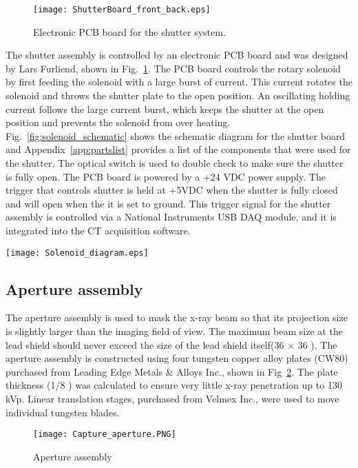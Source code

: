 \begin{figure}
\centering
\texttt{[image: ShutterBoard\_front\_back.eps]}
\caption{Electronic PCB board for the shutter system.}
\label{fig:shutterboard}
\end{figure}

The shutter assembly is controlled by an electronic PCB board and was designed by Lars Furliend, shown in Fig.~\ref{fig:shutterboard}.  The PCB board controls the rotary solenoid by first feeding the solenoid with a large burst of current.  This current rotates the solenoid and throws the shutter plate to the open position.  An oscillating holding current follows the large current burst, which keeps the shutter at the open position and prevents the solenoid from over heating.  Fig.~\ref{fig:solenoid_schematic} shows the schematic diagram for the shutter board and Appendix~\ref{app:partslist} provides a list of the components that were used for the shutter.  The optical switch is used to double check to make sure the shutter is fully open.  The PCB board is powered by a +24 VDC power supply.  The trigger that controls shutter is held at +5VDC when the shutter is fully closed and will open when the it is set to ground.  This trigger signal for the shutter assembly is controlled via a National Instruments USB DAQ module, and it is integrated into the CT acquisition software.
%
\begin{sidewaysfigure}[h]
\centering
\texttt{[image: Solenoid\_diagram.eps]}
\caption{Schematic for the solenoid PCB board}
\label{fig:solenoid_schematic}
\end{sidewaysfigure}
		
\subsection{Aperture assembly}
The aperture assembly is used to mask the x-ray beam so that its projection size is slightly larger than the imaging field of view.  The maximum beam size at the lead shield should never exceed the size of the lead shield itself(36 \inches $\times$ 36 \inches).  The aperture assembly is constructed using four tungsten copper alloy plates (CW80) purchased from Leading Edge Metals \& Alloys Inc., shown in Fig~\ref{fig:aperture}.  The plate thickness (1/8 \inches) was calculated to ensure very little x-ray penetration up to 130 kVp.  Linear translation stages, purchased from Velmex Inc., were used to move individual tungsten blades.
%
\begin{figure}[h]
\centering
\texttt{[image: Capture\_aperture.PNG]}
\caption{Aperture assembly}
\label{fig:aperture}
\end{figure}

